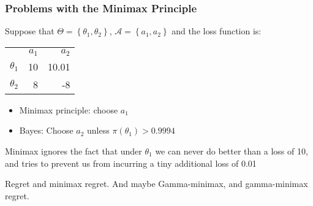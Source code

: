 \begin{frame}
  \frametitle{Problems with the Minimax Principle}
  \small

  Suppose that $\Theta = \left\{ \theta_1, \theta_2 \right\}$, $\mathcal{A} = \left\{ a_1, a_2 \right\}$ and the loss function is:
  \begin{table}
    \centering
    \begin{tabular}{lrr}
      & $a_1$ & $a_2$ \\
      \cline{2-3}
      $\theta_1$ & \multicolumn{1}{|r|}{10} & \multicolumn{1}{r|}{10.01} \\
      \cline{2-3}
      $\theta_2$ & \multicolumn{1}{|r|}{8} & \multicolumn{1}{r|}{-8}\\
      \cline{2-3}
    \end{tabular}
  \end{table}
  
  \vspace{1em}

  \begin{itemize}
    \item Minimax principle: choose $a_1$
    \item Bayes: Choose $a_2$ unless $\pi(\theta_1) > 0.9994$
  \end{itemize}


  \vspace{1em}

  \alert{Minimax ignores the fact that under $\theta_1$ we can never do better than a loss of 10, and tries to prevent us from incurring a tiny additional loss of 0.01}

\end{frame}
\begin{frame}

  Regret and minimax regret.
  And maybe Gamma-minimax, and gamma-minimax regret.
\end{frame}
